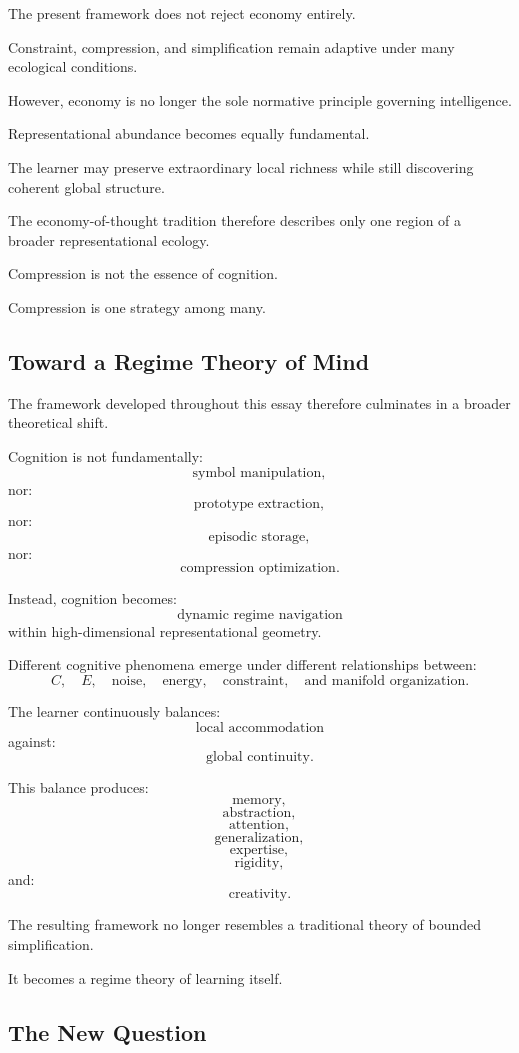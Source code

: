 \documentclass[12pt,a4paper]{article}
\begin{document}
The present framework does not reject economy entirely.

Constraint, compression, and simplification remain adaptive under many ecological conditions.

However, economy is no longer the sole normative principle governing intelligence.

Representational abundance becomes equally fundamental.

The learner may preserve extraordinary local richness while still discovering coherent global structure.

The economy-of-thought tradition therefore describes only one region of a broader representational ecology.

Compression is not the essence of cognition.

Compression is one strategy among many.

\subsection{Toward a Regime Theory of Mind}

The framework developed throughout this essay therefore culminates in a broader theoretical shift.

Cognition is not fundamentally:
\[
\text{symbol manipulation},
\]
nor:
\[
\text{prototype extraction},
\]
nor:
\[
\text{episodic storage},
\]
nor:
\[
\text{compression optimization}.
\]

Instead, cognition becomes:
\[
\text{dynamic regime navigation}
\]
within high-dimensional representational geometry.

Different cognitive phenomena emerge under different relationships between:
\[
C,
\quad
E,
\quad
\text{noise},
\quad
\text{energy},
\quad
\text{constraint},
\quad
\text{and manifold organization}.
\]

The learner continuously balances:
\[
\text{local accommodation}
\]
against:
\[
\text{global continuity}.
\]

This balance produces:
\[
\text{memory},
\]
\[
\text{abstraction},
\]
\[
\text{attention},
\]
\[
\text{generalization},
\]
\[
\text{expertise},
\]
\[
\text{rigidity},
\]
and:
\[
\text{creativity}.
\]

The resulting framework no longer resembles a traditional theory of bounded simplification.

It becomes a regime theory of learning itself.

\subsection{The New Question}
\end{document}
